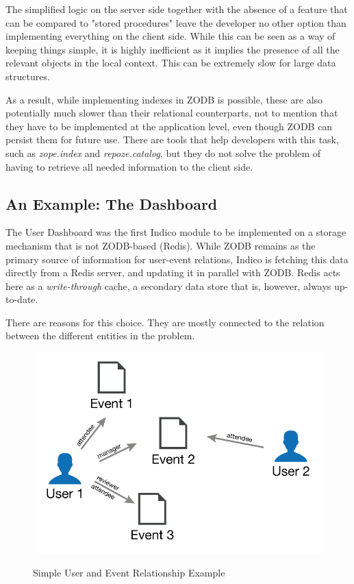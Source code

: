 The simplified logic on the server side together with the absence of a feature that can be compared to "stored procedures" leave the developer no other option than implementing everything on the client side. While this can be seen as a way of keeping things simple, it is highly inefficient as it implies the presence of all the relevant objects in the local context. This can be extremely slow for large data structures.

As a result, while implementing indexes in \textsc{ZODB} is possible, these are also potentially much slower than their relational counterparts, not to mention that they have to be implemented at the application level, even though ZODB can persist them for future use. There are tools that help developers with this task, such as \textit{zope.index} and \textit{repoze.catalog}, but they do not solve the problem of having to retrieve all needed information to the client side.

\subsection{An Example: The Dashboard}
 
The User Dashboard was the first Indico module to be implemented on a storage mechanism that is not ZODB-based (Redis). While ZODB remains as the primary source of information for user-event relations, Indico is fetching this data directly from a Redis server, and updating it in parallel with \textsc{ZODB}. Redis acts here as a \textit{write-through} cache, a secondary data store that is, however, always up-to-date.

There are reasons for this choice. They are mostly connected to the relation between the different entities in the problem.

\begin{figure}[H]
  \caption{Simple User and Event Relationship Example}
  \centering
    \includegraphics[scale=4]{2/figures/dashboard.png}
  \label{dash}
\end{figure}

